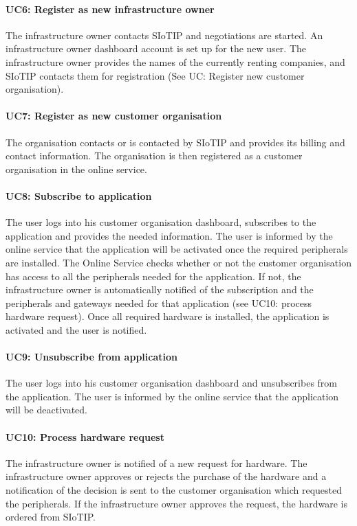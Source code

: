 \documentclass[english]{sareport}
\begin{document}
\paragraph{UC6: Register as new infrastructure owner}
The infrastructure owner contacts SIoTIP and negotiations are started. An infrastructure owner dashboard account is set up for the new user. The infrastructure owner provides the names of the currently renting companies, and SIoTIP contacts them for registration (See UC: Register new customer organisation).

\paragraph{UC7: Register as new customer organisation}
The organisation contacts or is contacted by SIoTIP and provides its billing and contact information. The organisation is then registered as a customer organisation in the online service.

\paragraph{UC8: Subscribe to application}
The user logs into his customer organisation dashboard, subscribes to the application and provides the needed information. The user is informed by the online service that the application will be activated once the required peripherals are installed. The Online Service checks whether or not the customer organisation has access to all the peripherals needed for the application. If not, the infrastructure owner is automatically notified of the subscription and the peripherals and gateways needed for that application (see UC10: process hardware request). Once all required hardware is installed, the application is activated and the user is notified.

\paragraph{UC9: Unsubscribe from application}
The user logs into his customer organisation dashboard and unsubscribes from the application. The user is informed by the online service that the application will be deactivated.

\paragraph{UC10: Process hardware request}
The infrastructure owner is notified of a new request for hardware. The infrastructure owner approves or rejects the purchase of the hardware and a notification of the decision is sent to the customer organisation which requested the peripherals. If the infrastructure owner approves the request, the hardware is ordered from SIoTIP.
\end{document}
